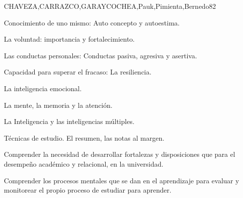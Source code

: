 \begin{syllabus}
\begin{unit}{}{CHAVEZA,CARRAZCO,GARAYCOCHEA,Pauk,Pimienta,Bernedo}{8}{2}
\begin{topics}
        \item Conocimiento de uno mismo: Auto concepto y autoestima.
        \item La voluntad: importancia y fortalecimiento.
        \item Las conductas personales: Conductas pasiva, agresiva y asertiva.
        \item Capacidad para superar el fracaso: La resiliencia.
        \item La inteligencia emocional.
        \item La mente, la memoria  y la atención.
        \item La Inteligencia y las inteligencias múltiples. 
        \item Técnicas de  estudio. El resumen, las notas al margen.       
\end{topics}
\begin{learningoutcomes}
        \item Comprender la necesidad de desarrollar  fortalezas y disposiciones que para el desempeño académico y relacional, en la universidad.
        \item Comprender los procesos mentales que se dan en el aprendizaje para evaluar y monitorear el propio proceso de estudiar para aprender.
\end{learningoutcomes}
\end{unit}


\end{syllabus}

